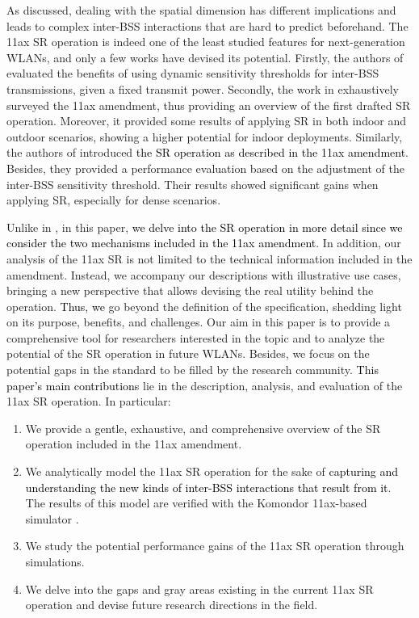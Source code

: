 \documentclass[preprint,12pt]{elsarticle}
\begin{document}
As discussed, dealing with the spatial dimension has different implications and leads to complex inter-BSS interactions that are hard to predict beforehand. The 11ax SR operation is indeed one of the least studied features \textcolor{black}{for} next-generation WLANs, and only a few works have devised its potential. Firstly, the authors of \cite{mori2014performance} evaluated the benefits of using dynamic sensitivity thresholds for inter-BSS transmissions, given a fixed transmit power. Secondly, the work in \cite{qu2018survey} exhaustively surveyed the 11ax amendment, thus providing an overview of the first drafted SR operation. Moreover, it provided some results \textcolor{black}{of} applying SR in both indoor and outdoor scenarios, showing a higher potential for indoor deployments. Similarly, the authors of \cite{shen2018research} introduced \textcolor{black}{the SR operation as described in the 11ax amendment}. Besides, they provided a performance evaluation based on the adjustment of the inter-BSS sensitivity threshold. Their results showed significant gains when applying SR, especially for dense scenarios. 

Unlike in \cite{mori2014performance, qu2018survey, shen2018research}, in this paper, \textcolor{black}{we delve into the SR operation in more detail since we consider the two mechanisms included in the 11ax amendment}. In addition, our analysis of the 11ax SR is not limited to the technical information included in the amendment. Instead, we accompany our descriptions with illustrative use cases, bringing a new perspective that allows devising the real utility behind the operation. \textcolor{black}{Thus, we} go beyond the definition of the specification, shedding light on its purpose, benefits, and challenges. Our aim in this paper is to provide a comprehensive tool for researchers interested in the topic and to analyze the potential of the SR operation in future WLANs. Besides, we focus on the potential gaps in the standard to be filled by the research community. \textcolor{black}{This paper's main contributions} lie in the description, analysis, and evaluation of the 11ax SR operation. In particular:
\begin{enumerate}
	\item We provide a gentle, exhaustive, and comprehensive overview of the SR operation included in the 11ax amendment.
	\item We analytically model the 11ax SR operation for the sake of \textcolor{black}{capturing and understanding the new kinds of inter-BSS interactions that result from it}. The results of this model are verified with the Komondor 11ax-based simulator \cite{barrachina2019komondor}.
	\item We study the potential performance gains of the 11ax SR operation through simulations. 
	\item We delve into the gaps and gray areas existing in the current 11ax SR operation and \textcolor{black}{devise} future research directions in the field.
\end{enumerate}
\end{document}
